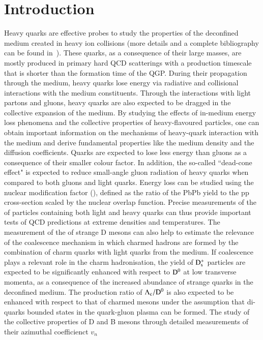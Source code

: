 \documentclass{webofc}
\begin{document}
\section{Introduction}
\label{intro}
Heavy quarks are effective probes to study the properties of the deconfined medium created in heavy ion collisions (more details and a complete bibliography can 
be found in~\cite{saporegravis}). These quarks, as a consequence of their large masses, are mostly produced in primary hard QCD scatterings with a production timescale that is shorter than the formation time of the 
QGP. During their propagation through the medium, heavy quarks lose energy via radiative and collisional 
interactions with the medium constituents. Through the interactions with light partons and gluons, heavy quarks are also expected to be dragged in the collective 
expansion of the medium. By studying the effects of in-medium energy loss phenomena and the collective properties of heavy-flavoured particles, 
one can obtain important information on the mechanisms of heavy-quark interaction with the medium and derive fundamental properties like the medium density 
and the diffusion coefficients. Quarks are expected to lose less energy than gluons as a consequence of their smaller colour factor. 
In addition, the so-called ``dead-cone effect" is expected to reduce small-angle gluon radiation of heavy quarks when compared to both 
gluons and light quarks.  Energy loss can be studied using the nuclear modification factor (\raa), defined as the ratio of the PbPb yield to the pp cross-section scaled by 
the nuclear overlap function. Precise measurements of the \raa of particles containing both light and heavy quarks can thus 
provide important tests of QCD predictions at extreme densities and temperatures. The measurement of the \raa of strange D mesons 
can also help to estimate the relevance of the coalescence mechanism in which charmed hadrons are formed 
by the combination of charm quarks with light quarks from the medium. If coalescence plays a relevant role in the charm hadronisation, 
the yield of $\rm D_{s}^{+}$ particles are expected to be significantly enhanced with respect to $\rm D^{0}$ at low transverse momenta, 
as a consequence of the increased abundance of strange quarks in the deconfined medium. The production ratio of $\rm \Lambda_{c}/\rm D^{0}$ 
is also expected to be enhanced with respect to that of charmed mesons under the assumption that di-quarks bounded states in the 
quark-gluon plasma can be formed. The study of the collective properties of D and B mesons through detailed measurements of their azimuthal coefficienct $v_{n}$ 
\end{document}
